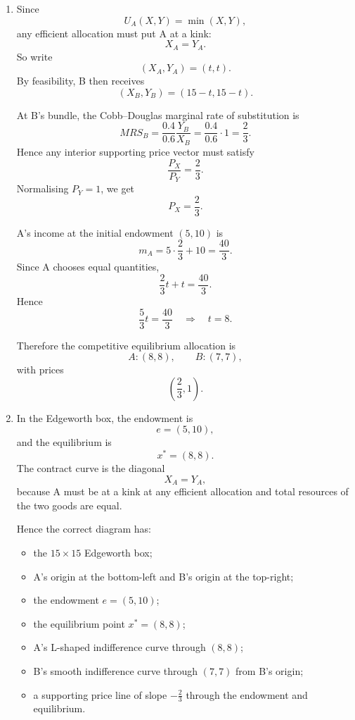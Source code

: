 \documentclass[12pt]{article}
\begin{document}
\begin{enumerate}[label=(\alph*)]
    \item
    Since
    \[
    U_A(X,Y)=\min(X,Y),
    \]
    any efficient allocation must put A at a kink:
    \[
    X_A=Y_A.
    \]
    So write
    \[
    (X_A,Y_A)=(t,t).
    \]
    By feasibility, B then receives
    \[
    (X_B,Y_B)=(15-t,15-t).
    \]

    At B's bundle, the Cobb--Douglas marginal rate of substitution is
    \[
    MRS_B=\frac{0.4}{0.6}\frac{Y_B}{X_B}
    =\frac{0.4}{0.6}\cdot 1
    =\frac23.
    \]
    Hence any interior supporting price vector must satisfy
    \[
    \frac{P_X}{P_Y}=\frac23.
    \]
    Normalising \(P_Y=1\), we get
    \[
    P_X=\frac23.
    \]

    A's income at the initial endowment \((5,10)\) is
    \[
    m_A=5\cdot\frac23+10=\frac{40}{3}.
    \]
    Since A chooses equal quantities,
    \[
    \frac23 t+t=\frac{40}{3}.
    \]
    Hence
    \[
    \frac53 t=\frac{40}{3}
    \quad\Longrightarrow\quad
    t=8.
    \]

    Therefore the competitive equilibrium allocation is
    \[
    A:(8,8),\qquad B:(7,7),
    \]
    with prices
    \[
    \left(\frac23,1\right).
    \]

    \item
    In the Edgeworth box, the endowment is
    \[
    e=(5,10),
    \]
    and the equilibrium is
    \[
    x^*=(8,8).
    \]
    The contract curve is the diagonal
    \[
    X_A=Y_A,
    \]
    because A must be at a kink at any efficient allocation and total resources of the two goods are equal.

    Hence the correct diagram has:
    \begin{itemize}
        \item the \(15\times 15\) Edgeworth box;
        \item A's origin at the bottom-left and B's origin at the top-right;
        \item the endowment \(e=(5,10)\);
        \item the equilibrium point \(x^*=(8,8)\);
        \item A's L-shaped indifference curve through \((8,8)\);
        \item B's smooth indifference curve through \((7,7)\) from B's origin;
        \item a supporting price line of slope \(-\frac23\) through the endowment and equilibrium.
    \end{itemize}


\end{enumerate}
\end{document}
